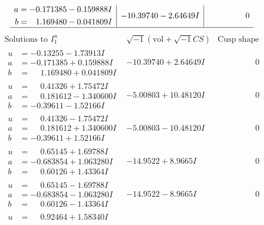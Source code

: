 \documentclass[1p]{elsarticle_modified}
\theoremstyle{definition}
\newcommand{\I}{\sqrt{-1}}
\begin{document}
$$\begin{array}{c|c|c}
\begin{aligned}
a &= -0.171385 - 0.159888 I \\
b &= \phantom{-}1.169480 - 0.041809 I\end{aligned}
 & -10.39740 - 2.64649 I & \phantom{-0.000000 } 0\\
 \hline 
 \end{array}$$\newpage$$\begin{array}{c|c|c}  
\text{Solutions to }I^u_{1}& \I (\text{vol} + \sqrt{-1}CS) & \text{Cusp shape}\\
 \hline 
\begin{aligned}
u &= -0.13255 - 1.73913 I \\
a &= -0.171385 + 0.159888 I \\
b &= \phantom{-}1.169480 + 0.041809 I\end{aligned}
 & -10.39740 + 2.64649 I & \phantom{-0.000000 } 0 \\ \hline\begin{aligned}
u &= \phantom{-}0.41326 + 1.75472 I \\
a &= \phantom{-}0.181612 - 1.340600 I \\
b &= -0.39611 - 1.52166 I\end{aligned}
 & -5.00803 + 10.48120 I & \phantom{-0.000000 } 0 \\ \hline\begin{aligned}
u &= \phantom{-}0.41326 - 1.75472 I \\
a &= \phantom{-}0.181612 + 1.340600 I \\
b &= -0.39611 + 1.52166 I\end{aligned}
 & -5.00803 - 10.48120 I & \phantom{-0.000000 } 0 \\ \hline\begin{aligned}
u &= \phantom{-}0.65145 + 1.69788 I \\
a &= -0.683854 + 1.063280 I \\
b &= \phantom{-}0.60126 + 1.43364 I\end{aligned}
 & -14.9522 + 8.9665 I & \phantom{-0.000000 } 0 \\ \hline\begin{aligned}
u &= \phantom{-}0.65145 - 1.69788 I \\
a &= -0.683854 - 1.063280 I \\
b &= \phantom{-}0.60126 - 1.43364 I\end{aligned}
 & -14.9522 - 8.9665 I & \phantom{-0.000000 } 0 \\ \hline\begin{aligned}
u &= \phantom{-}0.92464 + 1.58340 I \\

\end{aligned}
\end{array}$$
\end{document}
